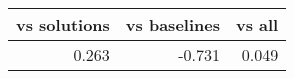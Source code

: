 
\begin{tabular}{ | r | r | r | }
    \hline
          vs solutions  &    vs baselines  &          vs all  \\
    \hline
    \hline
                 0.263  &          -0.731  &           0.049  \\
    \hline
\end{tabular}
